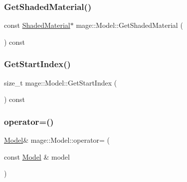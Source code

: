 \hypertarget{classmage_1_1_model_a84af7ad13b2bc1d8a51828a62fbaa4b0}{}\label{classmage_1_1_model_a84af7ad13b2bc1d8a51828a62fbaa4b0} 
\subsubsection{\texorpdfstring{Get\+Shaded\+Material()}{GetShadedMaterial()}\hspace{0.1cm}{\footnotesize\ttfamily [2/2]}}
{\footnotesize\ttfamily const \hyperlink{structmage_1_1_shaded_material}{Shaded\+Material}$\ast$ mage\+::\+Model\+::\+Get\+Shaded\+Material (\begin{DoxyParamCaption}{ }\end{DoxyParamCaption}) const}

\hypertarget{classmage_1_1_model_af17401dfd3e51f96dc0652a3aa3c4412}{}\label{classmage_1_1_model_af17401dfd3e51f96dc0652a3aa3c4412} 
\subsubsection{\texorpdfstring{Get\+Start\+Index()}{GetStartIndex()}}
{\footnotesize\ttfamily size\+\_\+t mage\+::\+Model\+::\+Get\+Start\+Index (\begin{DoxyParamCaption}{ }\end{DoxyParamCaption}) const}

\hypertarget{classmage_1_1_model_a563515c64ec39cfcda9f6ca37576391b}{}\label{classmage_1_1_model_a563515c64ec39cfcda9f6ca37576391b} 
\subsubsection{\texorpdfstring{operator=()}{operator=()}\hspace{0.1cm}{\footnotesize\ttfamily [1/2]}}
{\footnotesize\ttfamily \hyperlink{classmage_1_1_model}{Model}\& mage\+::\+Model\+::operator= (\begin{DoxyParamCaption}\item[{const \hyperlink{classmage_1_1_model}{Model} \&}]{model }\end{DoxyParamCaption})\hspace{0.3cm}{\ttfamily [delete]}}

